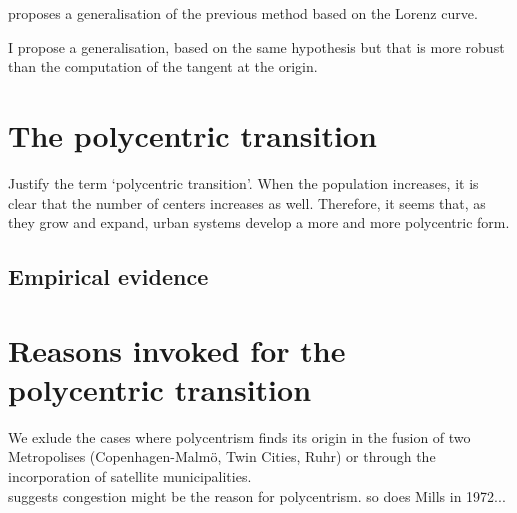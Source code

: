 \cite{Louail:2014} proposes a generalisation of the previous method based on the
Lorenz curve.

I propose a generalisation, based on the same hypothesis but that is more robust
than the computation of the tangent at the origin.


\section{The polycentric transition}
\label{sec:the_polycentric_transition}

Justify the term `polycentric transition'. When the population increases, it is
clear that the number of centers increases as well. Therefore, it seems that, as
they grow and expand, urban systems develop a more and more polycentric form.

\subsection{Empirical evidence}
\label{sub:empirical_evidence}


\section{Reasons invoked for the polycentric transition}
\label{sec:reasons_invoked_for_the_polycentric_transition}

We exlude the cases where polycentrism finds its origin in the fusion of two
Metropolises (Copenhagen-Malm\"o, Twin Cities, Ruhr) or through the
incorporation of satellite municipalities.\\


\cite{McMillen:2003} suggests congestion might be the reason for polycentrism.
so does Mills in 1972...

